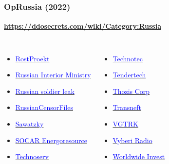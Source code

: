 \documentclass[aspectratio=169,usenames,dvipsnames]{beamer}
\begin{document}
\begin{frame}[t]
  \frametitle{OpRussia (2022)}
  \framesubtitle{\url{https://ddosecrets.com/wiki/Category:Russia}}

  \begin{columns}[T]
    \footnotesize
    \begin{itemize}
      \item \href{https://ddosecrets.com/wiki/RostProekt}{\textcolor{blue}{RostProekt}}
      \item \href{https://ddosecrets.com/wiki/Russian_Interior_Ministry}{\textcolor{blue}{Russian Interior Ministry}}
      \item \href{https://ddosecrets.com/wiki/Russian_soldier_leak}{\textcolor{blue}{Russian soldier leak}}
      \item \href{https://ddosecrets.com/wiki/RussianCensorFiles}{\textcolor{blue}{RussianCensorFiles}}
      \item \href{https://ddosecrets.com/wiki/Sawatzky}{\textcolor{blue}{Sawatzky}}
      \item \href{https://ddosecrets.com/wiki/SOCAR_Energoresource}{\textcolor{blue}{SOCAR Energoresource}}
      \item \href{https://ddosecrets.com/wiki/Technoserv}{\textcolor{blue}{Technoserv}}
    \end{itemize}
    \begin{itemize}
      \item \href{https://ddosecrets.com/wiki/Technotec}{\textcolor{blue}{Technotec}}
      \item \href{https://ddosecrets.com/wiki/Tendertech}{\textcolor{blue}{Tendertech}}
      \item \href{https://ddosecrets.com/wiki/Thozis_Corp}{\textcolor{blue}{Thozis Corp}}
      \item \href{https://ddosecrets.com/wiki/Transneft}{\textcolor{blue}{Transneft}}
      \item \href{https://ddosecrets.com/wiki/VGTRK}{\textcolor{blue}{VGTRK}}
      \item \href{https://ddosecrets.com/wiki/Vyberi_Radio}{\textcolor{blue}{Vyberi Radio}}
      \item \href{https://ddosecrets.com/wiki/Worldwide_Invest}{\textcolor{blue}{Worldwide Invest}}
    \end{itemize}
  \end{columns}
\end{frame}
\end{document}
